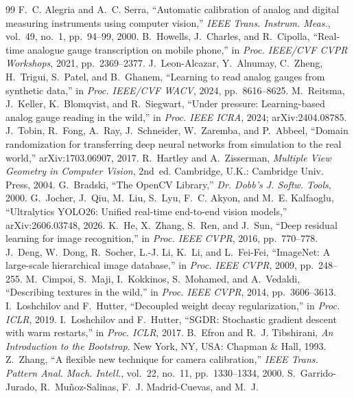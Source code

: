 \documentclass[conference]{IEEEtran}
\begin{document}
\begin{thebibliography}{99}
 F.~C. Alegria and A.~C. Serra, ``Automatic calibration of analog and digital measuring
instruments using computer vision,'' \emph{IEEE Trans. Instrum. Meas.}, vol.~49, no.~1, pp.~94--99, 2000.
 B.~Howells, J.~Charles, and R.~Cipolla, ``Real-time analogue gauge transcription on mobile
phone,'' in \emph{Proc. IEEE/CVF CVPR Workshops}, 2021, pp.~2369--2377.
 J.~Leon-Alcazar, Y.~Alnumay, C.~Zheng, H.~Trigui, S.~Patel, and B.~Ghanem, ``Learning
to read analog gauges from synthetic data,'' in \emph{Proc. IEEE/CVF WACV}, 2024, pp.~8616--8625.
 M.~Reitsma, J.~Keller, K.~Blomqvist, and R.~Siegwart, ``Under pressure: Learning-based
analog gauge reading in the wild,'' in \emph{Proc. IEEE ICRA}, 2024; arXiv:2404.08785.
 J.~Tobin, R.~Fong, A.~Ray, J.~Schneider, W.~Zaremba, and P.~Abbeel, ``Domain randomization
for transferring deep neural networks from simulation to the real world,'' arXiv:1703.06907, 2017.
 R.~Hartley and A.~Zisserman, \emph{Multiple View Geometry in Computer Vision}, 2nd~ed.
Cambridge, U.K.: Cambridge Univ. Press, 2004.
 G.~Bradski, ``The OpenCV Library,'' \emph{Dr. Dobb's J. Softw. Tools}, 2000.
 G.~Jocher, J.~Qiu, M.~Liu, S.~Lyu, F.~C. Akyon, and M.~E. Kalfaoglu, ``Ultralytics YOLO26:
Unified real-time end-to-end vision models,'' arXiv:2606.03748, 2026.
 K.~He, X.~Zhang, S.~Ren, and J.~Sun, ``Deep residual learning for image recognition,'' in
\emph{Proc. IEEE CVPR}, 2016, pp.~770--778.
 J.~Deng, W.~Dong, R.~Socher, L.-J. Li, K.~Li, and L.~Fei-Fei, ``ImageNet: A large-scale
hierarchical image database,'' in \emph{Proc. IEEE CVPR}, 2009, pp.~248--255.
 M.~Cimpoi, S.~Maji, I.~Kokkinos, S.~Mohamed, and A.~Vedaldi, ``Describing textures in the
wild,'' in \emph{Proc. IEEE CVPR}, 2014, pp.~3606--3613.
 I.~Loshchilov and F.~Hutter, ``Decoupled weight decay regularization,'' in
\emph{Proc. ICLR}, 2019.
 I.~Loshchilov and F.~Hutter, ``SGDR: Stochastic gradient descent with warm restarts,''
in \emph{Proc. ICLR}, 2017.
 B.~Efron and R.~J. Tibshirani, \emph{An Introduction to the Bootstrap}. New York, NY, USA:
Chapman \& Hall, 1993.
 Z.~Zhang, ``A flexible new technique for camera calibration,'' \emph{IEEE Trans. Pattern
Anal. Mach. Intell.}, vol.~22, no.~11, pp.~1330--1334, 2000.
 S.~Garrido-Jurado, R.~Mu\~noz-Salinas, F.~J. Madrid-Cuevas, and M.~J.

\end{thebibliography}
\end{document}

